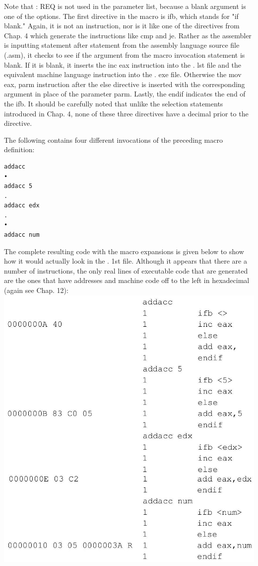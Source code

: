 \documentclass[10pt]{article}
\begin{document}
Note that : REQ is not used in the parameter list, because a blank argument is one of the options. The first directive in the macro is ifb, which stands for "if blank." Again, it is not an instruction, nor is it like one of the directives from Chap. 4 which generate the instructions like cmp and je. Rather as the assembler is inputting statement after statement from the assembly language source file (.asm), it checks to see if the argument from the macro invocation statement is blank. If it is blank, it inserts the inc eax instruction into the . lst file and the equivalent machine language instruction into the . exe file. Otherwise the mov eax, parm instruction after the else directive is inserted with the corresponding argument in place of the parameter parm. Lastly, the endif indicates the end of the ifb. It should be carefully noted that unlike the selection statements introduced in Chap. 4, none of these three directives have a decimal prior to the directive.

The following contains four different invocations of the preceding macro definition:

\begin{verbatim}
addacc
•
addacc 5
.
addacc edx
.
•
addacc num
\end{verbatim}

The complete resulting code with the macro expansions is given below to show how it would actually look in the . 1st file. Although it appears that there are a number of instructions, the only real lines of executable code that are generated are the ones that have addresses and machine code off to the left in hexadecimal (again see Chap. 12):\\
\includegraphics[max width=\textwidth, center]{2025_03_24_ebe50cc223a6fbc49eecg-153}
\end{document}
